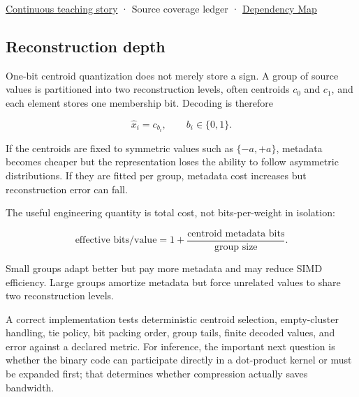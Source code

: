 \hyperref[01-foundations-i-ch001-choosing-what-information-to-keep]{Continuous teaching story} · {Source coverage ledger} · \hyperref[appendix-4ad47bdd269a]{Dependency Map}

\subsection{Reconstruction depth}\label{appendix-4ccd7a775813-reconstruction-depth}

One-bit centroid quantization does not merely store a sign. A group of source values is partitioned into two reconstruction levels, often centroids \(c_0\) and \(c_1\), and each element stores one membership bit. Decoding is therefore

\[
\hat x_i = c_{b_i},
\qquad b_i\in\{0,1\}.
\]

If the centroids are fixed to symmetric values such as \(\{-a,+a\}\), metadata becomes cheaper but the representation loses the ability to follow asymmetric distributions. If they are fitted per group, metadata cost increases but reconstruction error can fall.

The useful engineering quantity is total cost, not bits-per-weight in isolation:

\[
\text{effective bits/value}
=
1 + \frac{\text{centroid metadata bits}}{\text{group size}}.
\]

Small groups adapt better but pay more metadata and may reduce SIMD efficiency. Large groups amortize metadata but force unrelated values to share two reconstruction levels.

A correct implementation tests deterministic centroid selection, empty-cluster handling, tie policy, bit packing order, group tails, finite decoded values, and error against a declared metric. For inference, the important next question is whether the binary code can participate directly in a dot-product kernel or must be expanded first; that determines whether compression actually saves bandwidth.
